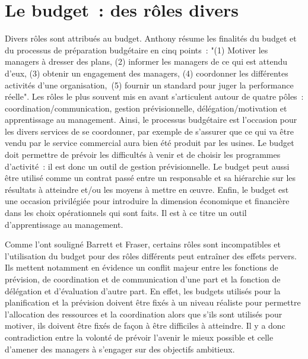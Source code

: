 \documentclass[oneside]{kaobook}
\begin{document}
\section{Le budget : des rôles divers}
\label{sec:orgd4def0c}
Divers rôles sont attribués au budget. Anthony résume les finalités du budget et du processus de préparation budgétaire en cinq points : "(1) Motiver les managers à dresser des plans, (2) informer les managers de ce qui est attendu d'eux, (3) obtenir un engagement des managers, (4) coordonner les différentes activités d'une organisation, (5) fournir un standard pour juger la performance réelle". 
Les rôles le plus souvent mis en avant s'articulent autour de quatre pôles : coordination/communication, gestion prévisionnelle, délégation/motivation et apprentissage au management. Ainsi, le processus budgétaire est l'occasion pour les divers services de se coordonner, par exemple de s'assurer que ce qui va être vendu par le service commercial aura bien été produit par les usines. Le budget doit permettre de prévoir les difficultés à venir et de choisir les programmes d'activité : il est donc un outil de gestion prévisionnelle. Le budget peut aussi être utilisé comme un contrat passé entre un responsable et sa hiérarchie sur les résultats à atteindre et/ou les moyens à mettre en œuvre. Enfin, le budget est une occasion privilégiée pour introduire la dimension économique et financière dans les choix opérationnels qui sont faits. Il est à ce titre un outil d'apprentissage au management.

\begin{kaobox}
Comme l'ont souligné Barrett et Fraser, certains rôles sont incompatibles et l'utilisation du budget pour des rôles différents peut entraîner des effets pervers. Ils mettent notamment en évidence un conflit majeur entre les fonctions de prévision, de coordination et de communication d'une part et la fonction de délégation et d'évaluation d'autre part. En effet, les budgets utilisés pour la planification et la prévision doivent être fixés à un niveau réaliste pour permettre l'allocation des ressources et la coordination alors que s'ils sont utilisés pour motiver, ils doivent être fixés de façon à être difficiles à atteindre. Il y a donc contradiction entre la volonté de prévoir l'avenir le mieux possible et celle d'amener des managers à s'engager sur des objectifs ambitieux.
\end{kaobox}
\end{document}
